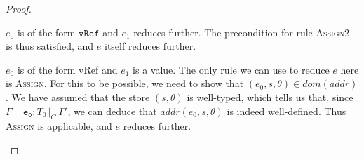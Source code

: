 \documentclass[12pt,a4paper,twoside,openright]{report}
\theoremstyle{definition}
\theoremstyle{dotless}
\newcommand{\typed}[2]{\Gamma{}\vdash\mathtt{#1}: #2\,|_C\:\Gamma'}
\begin{document}
\begin{proof}
\begin{case}[AssignType]
	\begin{subcase}
	  $e_0$ is of the form $\mathtt{vRef}$ and $e_1$ reduces further. 
	  The precondition for rule \textsc{Assign2} is thus satisfied, and $e$
	  itself reduces further.
	\end{subcase}

	\begin{subcase}
	  $e_0$ is of the form vRef and $e_1$ is a value.
	  The only rule we can use to reduce $e$ here is \textsc{Assign}. For this
	  to be possible, we need to show that $(e_0, s, \theta) \in dom(addr)$.
	  We have assumed that the store $(s,\theta)$ is well-typed, which tells us
	  that, since $\typed{e_0}{T_0}$, we can deduce that $addr(e_0,s,\theta)$
	  is indeed well-defined. Thus \textsc{Assign} is applicable, and $e$
	  reduces further.  
	\end{subcase}

  \end{case}

\end{proof}
\end{document}
